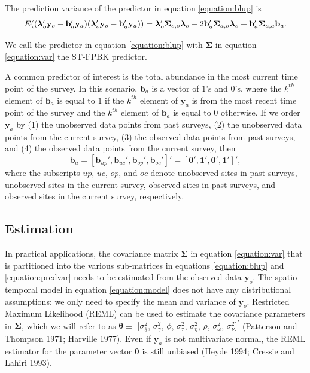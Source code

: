 \documentclass[smallextended]{svjour3}       %
\begin{document}
The prediction variance of the predictor in equation \ref{equation:blup}
is \mbox{} \begin{equation} \label{equation:predvar}
E((\bm{\lambda}_o'\mathbf{y}_o - \mathbf{b}_a'\mathbf{y}_a)(\bm{\lambda}_o'\mathbf{y}_o - \mathbf{b}_a'\mathbf{y}_a)) = \\
\bm{\lambda}_o'\bm{\Sigma}_{o, o}\bm{\lambda}_o - 2 \mathbf{b}_a' \bm{\Sigma}_{a, o} \bm{\lambda}_o + \mathbf{b}_a' \bm{\Sigma}_{a, a} \mathbf{b}_a.
\end{equation}

\noindent We call the predictor in equation \ref{equation:blup} with
\(\bm{\Sigma}\) in equation \ref{equation:var} the ST-FPBK predictor.

A common predictor of interest is the total abundance in the most
current time point of the survey. In this scenario, \(\mathbf{b}_a\) is
a vector of \(1\)'s and \(0\)'s, where the \(k^{th}\) element of
\(\mathbf{b}_a\) is equal to \(1\) if the \(k^{th}\) element of
\(\mathbf{y}_a\) is from the most recent time point of the survey and
the \(k^{th}\) element of \(\mathbf{b}_a\) is equal to 0 otherwise. If
we order \(\mathbf{y}_a\) by (1) the unobserved data points from past
surveys, (2) the unobserved data points from the current survey, (3) the
observed data points from past surveys, and (4) the observed data points
from the current survey, then \mbox{}
\begin{equation} \label{equation:currentweights}
\mathbf{b}_a = [\mathbf{b}_{up}', \mathbf{b}_{uc}', \mathbf{b}_{op}', \mathbf{b}_{oc}']' = [\mathbf{0}', \mathbf{1}', \mathbf{0}', \mathbf{1}']',
\end{equation} \noindent where the subscripts \(up\), \(uc\), \(op\),
and \(oc\) denote unobserved sites in past surveys, unobserved sites in
the current survey, observed sites in past surveys, and observed sites
in the current survey, respectively.

\hypertarget{estimation}{%
\subsection{Estimation}\label{estimation}}

In practical applications, the covariance matrix \(\bm{\Sigma}\) in
equation \ref{equation:var} that is partitioned into the various
sub-matrices in equations \ref{equation:blup} and \ref{equation:predvar}
needs to be estimated from the observed data \(\mathbf{y}_o\). The
spatio-temporal model in equation \ref{equation:model} does not have any
distributional assumptions: we only need to specify the mean and
variance of \(\mathbf{y}_o\). Restricted Maximum Likelihood (REML) can
be used to estimate the covariance parameters in \(\bm{\Sigma}\), which
we will refer to as \(\bm{\theta} \equiv\) \([\sigma^2_{\delta}\),
\(\sigma^2_{\gamma}\), \(\phi\), \(\sigma^2_{\tau}\),
\(\sigma^2_{\eta}\), \(\rho\), \(\sigma^2_{\omega}\),
\(\sigma^2_{\nu}]^\prime\) (Patterson and Thompson 1971; Harville 1977).
Even if \(\mathbf{y}_a\) is not multivariate normal, the REML estimator
for the parameter vector \(\bm{\theta}\) is still unbiased (Heyde 1994;
Cressie and Lahiri 1993).
\end{document}

